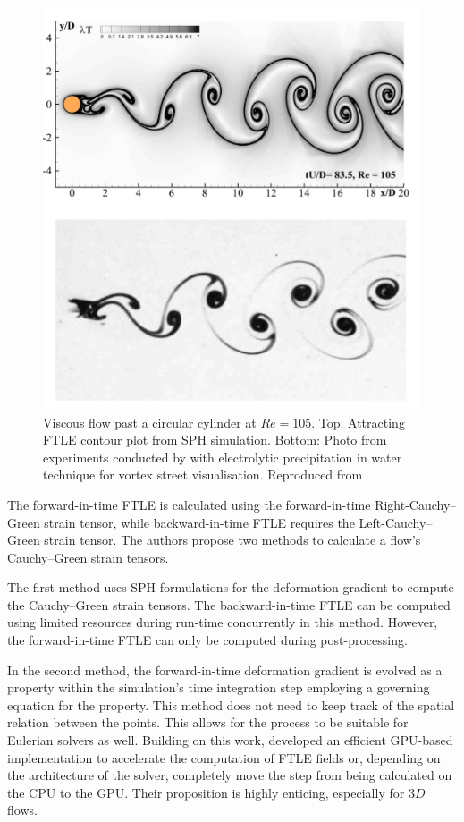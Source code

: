 \begin{figure}[H]
    \centering
    \includegraphics{Figures/research_papers/sun2016detection-fig-1.png}
    \caption{Viscous flow past a circular cylinder at $Re = 105$. Top: Attracting FTLE contour plot from SPH simulation. Bottom: Photo from experiments conducted by \cite{taneda1977visual} with electrolytic precipitation in water technique for vortex street visualisation. Reproduced from \cite{sun2016detection}}
    \label{fig:sun2016detection-fig-1}
\end{figure}

The forward-in-time FTLE is calculated using the forward-in-time Right-Cauchy–Green strain tensor, while backward-in-time FTLE requires the Left-Cauchy–Green strain tensor.
The authors propose two methods to calculate a flow's Cauchy–Green strain tensors.

The first method uses SPH formulations for the deformation gradient to compute the Cauchy–Green strain tensors. The backward-in-time FTLE can be computed using limited resources during run-time concurrently in this method. However, the forward-in-time FTLE can only be computed during post-processing.

In the second method, the forward-in-time deformation gradient is evolved as a property within the simulation's time integration step employing a governing equation for the property. This method does not need to keep track of the spatial relation between the points. This allows for the process to be suitable for Eulerian solvers as well.
Building on this work, \cite{dauch2018highly} developed an efficient GPU-based implementation to accelerate the computation of FTLE fields or, depending on the architecture of the solver, completely move the step from being calculated on the CPU to the GPU. Their proposition is highly enticing, especially for $3D$ flows.

